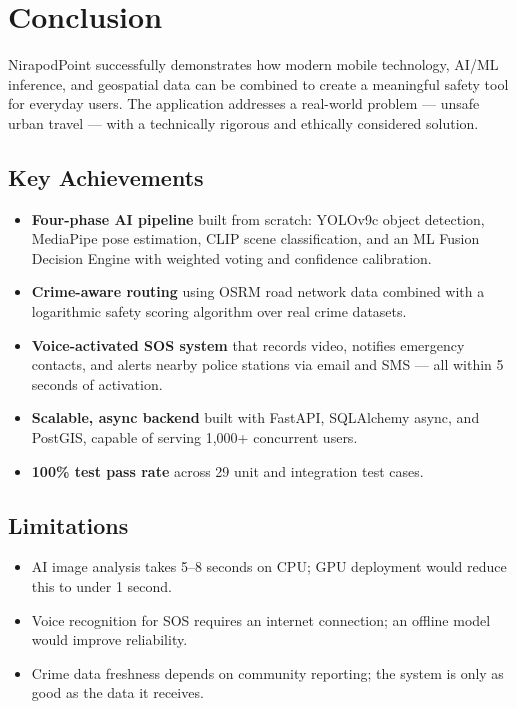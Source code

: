 \documentclass[12pt,a4paper]{report}
\begin{document}
\chapter{Conclusion}

NirapodPoint successfully demonstrates how modern mobile technology, AI/ML inference, and geospatial data can be combined to create a meaningful safety tool for everyday users. The application addresses a real-world problem — unsafe urban travel — with a technically rigorous and ethically considered solution.

\section{Key Achievements}
\begin{itemize}[leftmargin=*]
    \item \textbf{Four-phase AI pipeline} built from scratch: YOLOv9c object detection, MediaPipe pose estimation, CLIP scene classification, and an ML Fusion Decision Engine with weighted voting and confidence calibration.
    \item \textbf{Crime-aware routing} using OSRM road network data combined with a logarithmic safety scoring algorithm over real crime datasets.
    \item \textbf{Voice-activated SOS system} that records video, notifies emergency contacts, and alerts nearby police stations via email and SMS — all within 5 seconds of activation.
    \item \textbf{Scalable, async backend} built with FastAPI, SQLAlchemy async, and PostGIS, capable of serving 1,000+ concurrent users.
    \item \textbf{100\% test pass rate} across 29 unit and integration test cases.
\end{itemize}

\section{Limitations}
\begin{itemize}[leftmargin=*]
    \item AI image analysis takes 5--8 seconds on CPU; GPU deployment would reduce this to under 1 second.
    \item Voice recognition for SOS requires an internet connection; an offline model would improve reliability.
    \item Crime data freshness depends on community reporting; the system is only as good as the data it receives.
\end{itemize}
\end{document}
